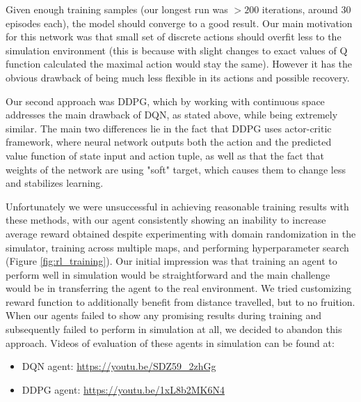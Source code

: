 \documentclass{article}
\begin{document}
Given enough training samples (our longest run was $>200$ iterations, around 30 episodes each), the model should converge to a good result. Our main motivation for this network was that small set of discrete actions should overfit less to the simulation environment (this is because with slight changes to exact values of Q function calculated the maximal action would stay the same). However it has the obvious drawback of being much less flexible in its actions and possible recovery.

Our second approach was DDPG, which by working with continuous space addresses the main drawback of DQN, as stated above, while being extremely similar. The main two differences lie in the fact that DDPG uses actor-critic framework, where neural network outputs both the action and the predicted value function of state input and action tuple, as well as that the fact that weights of the network are using "soft" target, which causes them to change less and stabilizes learning.

Unfortunately we were unsuccessful in achieving reasonable training results with these methods, with our agent consistently showing an inability to increase average reward obtained despite experimenting with domain randomization in the simulator, training across multiple maps, and performing hyperparameter search (Figure \ref{fig:rl_training}). Our initial impression was that training an agent to perform well in simulation would be straightforward and the main challenge would be in transferring the agent to the real environment. We tried customizing reward function to additionally benefit from distance travelled, but to no fruition. When our agents failed to show any promising results during training and subsequently failed to perform in simulation at all, we decided to abandon this approach. Videos of evaluation of these agents in simulation can be found at:
\begin{itemize}
    \item DQN agent: \url{https://youtu.be/SDZ59_2zhGg}
    \item DDPG agent: \url{https://youtu.be/1xL8b2MK6N4}
\end{itemize}
\end{document}
